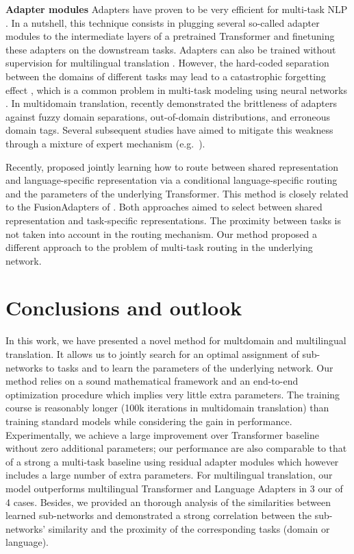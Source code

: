 \documentclass[11pt]{article}
\newcommand{\fyDone}[1]{\done[FY]\Todo[FY:]{\textcolor{orange}{#1}}}
\begin{document}
\textbf{Adapter modules} Adapters have proven to be very efficient for multi-task NLP \citep{houlsby19parameter,Bapna19simple,Pham20Study,pfeiffer20adapterhub}. In a nutshell, this technique consists in plugging several so-called adapter modules to the intermediate layers of a pretrained Transformer and finetuning these adapters on the downstream tasks. Adapters can also be trained without supervision for multilingual translation \citep{Philip20monolingual}. However, the hard-coded separation between the domains of different tasks may lead to a catastrophic forgetting effect \citep{pfeiffer21adapterfusion}, which is a common problem in multi-task modeling using neural networks \citep{Michael89catastrophic}. In multidomain translation, \citet{Pham21revisiting} recently demonstrated the brittleness of adapters against fuzzy domain separations, out-of-domain distributions, and erroneous domain tags. Several subsequent studies have aimed to mitigate this weakness through a mixture of expert mechanism (e.g.\ \cite{pfeiffer21adapterfusion}).

Recently, \citet{biao21share} proposed jointly learning how to route between shared representation and language-specific representation via a conditional language-specific routing and the parameters of the underlying Transformer. This method is closely related to the FusionAdapters of \citet{pfeiffer21adapterfusion}. Both approaches aimed to select between shared representation and task-specific representations. The proximity between tasks is not taken into account in the routing mechanism. Our method proposed a different approach to the problem of multi-task routing in the underlying network.

\section{Conclusions and outlook}\label{sec:conclusion}
In this work, we have presented a novel method for multdomain and multilingual translation. It allows us to jointly search for an optimal assignment of sub-networks to tasks and to learn the parameters of the underlying network. Our method relies on a sound mathematical framework and an end-to-end optimization procedure which implies very little extra parameters. The training course is reasonably longer (100k iterations in multidomain translation) than training standard models while considering the gain in performance.\fyDone{There is a computational cost = 100k iterations} Experimentally, we achieve a large improvement over Transformer baseline without zero additional parameters; our performance are also comparable to that of a strong a multi-task baseline using residual adapter modules which however includes a large number of extra parameters. For multilingual translation, our model outperforms multilingual Transformer and Language Adapters in 3 our of 4 cases. Besides, we provided an thorough analysis of the similarities between learned sub-networks and demonstrated a strong correlation between the sub-networks' similarity and the proximity of the corresponding tasks (domain or language).
\end{document}
